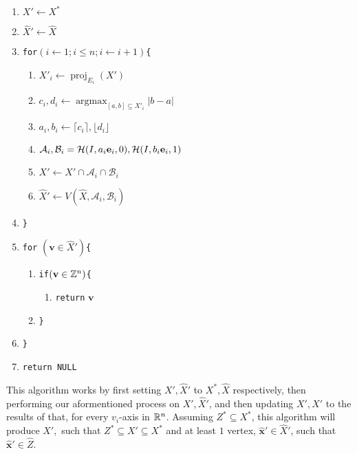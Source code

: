 \documentclass[conference]{IEEEtran}
\numberwithin{equation}{section}
\numberwithin{figure}{section}
\theoremstyle{plain}
\theoremstyle{definition}
\newcommand{\R}{\ensuremath \mathbb{R}}
\newcommand{\Z}{\ensuremath \mathbb{Z}}
\newcommand{\1}{\ensuremath \mathbbm{1}}
\newcommand{\Half}{\ensuremath \mathcal{H}}
\DeclareMathOperator{\vproj}{proj}
\DeclareMathOperator{\argmax}{argmax}
\begin{document}
\begin{enumerate}
  \item[] $X' \gets X^*$ \\
  \item[] $\hat{X}' \gets \hat{X}$ \\
  \item[] \verb|for|$(i \gets 1; i \leq n; i \gets i + 1)$\verb|{| \\
  \begin{enumerate}
    \item[] $X'_i \gets \vproj_{E_i}(X')$ \\
    \item[] $c_i,d_i \gets \argmax_{[a,b] \subseteq X'_i}|b-a|$ \\
    \item[] $a_i,b_i \gets \lceil c_i \rceil,\lfloor d_i \rfloor$ \\
    \item[] $\mathcal{A}_i,\mathcal{B}_i = \Half(I,a_i\mathbf{e}_i,0),\Half(I,b_i\mathbf{e}_i,1)$ \\
    \item[] $X' \gets X' \cap \mathcal{A}_i \cap \mathcal{B}_i$ \\
    \item[] $\hat{X}' \gets V(\hat{X},\mathcal{A}_i,\mathcal{B}_i)$ \\
  \end{enumerate}
  \item[] \verb|}| \\
  \item[] \verb|for| $(\mathbf{v} \in \hat{X}')$\verb|{| \\
  \begin{enumerate}
    \item[] \verb|if|$(\mathbf{v} \in \Z^n)$\verb|{| \\
    \begin{enumerate}
      \item[] \verb|return| $\mathbf{v}$ \\
    \end{enumerate}
    \item[] \verb|}| \\
  \end{enumerate}
  \item[] \verb|}| \\
  \item[] \verb|return NULL| \\
\end{enumerate}
This algorithm works by first setting $X',\hat{X}'$ to $X^*,\hat{X}$ 
respectively, then performing our aformentioned process on $X',\hat{X}'$, and 
then updating $X',\hat{X}'$ to the results of that, for every $v_i$-axis in 
$\R^n$. Assuming $Z^* \subseteq X^*$, this algorithm will produce $X',$ such that 
$Z^* \subseteq X' \subseteq X^*$ and at least $1$ vertex, $\mathbf{\hat{x}}' \in 
\hat{X}'$, such that $\mathbf{\hat{x}}' \in \hat{Z}$. \\
\end{document}
